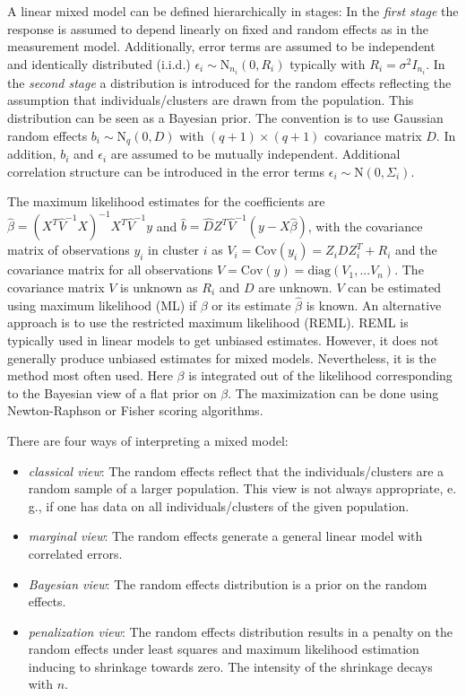 \documentclass[12pt]{article}
\begin{document}
A linear mixed model can be defined hierarchically in stages: 
In the \textit{first stage} the response is assumed to depend linearly on fixed and random effects as in the measurement model. Additionally, error terms are assumed to be independent and identically distributed (i.i.d.) $\epsilon_i \sim \mathrm{N}_{n_i}(0,R_i)$ typically with $R_i=\sigma^2 I_{n_i}$. 
In the \textit{second stage} a distribution is introduced for the random effects reflecting the assumption that individuals/clusters are drawn from the population.
This distribution can be seen as a Bayesian prior. The convention is to use Gaussian random effects $b_i \sim \mathrm{N}_q(0,D)$ with $(q{+}1)\times (q{+}1)$ covariance matrix $D$. In addition, $b_i$ and $\epsilon_i$ are assumed to be mutually independent. 
Additional correlation structure can be introduced in the error terms $\epsilon_i \sim \mathrm{N}(0, \Sigma_i)$.



The maximum likelihood estimates for the coefficients are $\hat{\beta} = (X^T \hat{V}^{-1} X)^{-1} X^T \hat{V}^{-1}y$ and $\hat{b} = \hat{D}Z^T\hat{V}^{-1} (y-X\hat{\beta})$, with the covariance matrix of observations $y_i$ in cluster $i$ as $V_i = \mathrm{Cov}(y_i) = Z_iDZ_i^T + R_i$ and the covariance matrix for all observations $V = \mathrm{Cov}(y) = \mathrm{diag}(V_1,...V_n)$.
The covariance matrix $V$ is unknown as $R_i$ and $D$ are unknown. $V$ can be estimated  using maximum likelihood (ML) if $\beta$ or its estimate $\hat{\beta}$ is known. An alternative approach is to use the restricted  maximum likelihood  (REML). REML is typically used in linear models to get unbiased estimates. However, it does not generally produce unbiased estimates for mixed models. Nevertheless, it is the method most often used. Here $\beta$ is integrated out of the likelihood corresponding to the Bayesian view of a flat prior on $\beta$. The maximization can be done using Newton-Raphson or Fisher scoring algorithms. 

There are four ways of interpreting a mixed model:
\begin{itemize}
\item \textit{classical view}: The random effects reflect that the individuals/clusters are a random sample of a larger population. This view is not always appropriate, e.\,g., if one has data on all individuals/clusters of the given population.
\item \textit{marginal view}: The random effects generate a general linear
model with correlated errors.
\item \textit{Bayesian view}: The random effects distribution is a prior on the random effects.
\item \textit{penalization view}: The random effects distribution results in a penalty on the random effects under least squares and maximum likelihood estimation inducing to shrinkage towards zero. The intensity of the shrinkage decays with $n$.
\end{itemize}
\end{document}
